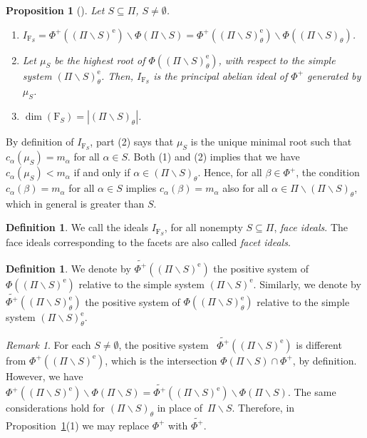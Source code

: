 \documentclass[10pt]{amsart}
\newtheorem{pro}[thm]{Proposition}
\theoremstyle{definition}
\newtheorem{defi}[thm]{Definition}
\theoremstyle{remark}
\newtheorem{rem}[thm]{Remark}
\newcommand\wt{\widetilde}
\newcommand\smeno{\smallsetminus}
\newcommand\al{\alpha}
\newcommand\be{\beta}
\newcommand\erm{{\mathrm{e}}}
\begin{document}
\begin{pro} [\cite{CM1}] \label{pro:IMRN}
Let $S\subseteq \Pi$, $S\neq\emptyset$.
\begin{enumerate}
\item\label{IMRN-1}
$I_{\mathrm F_S}=\Phi^+((\Pi\smeno S)^\erm)\smeno \Phi(\Pi\smeno S)=\Phi^+((\Pi\smeno S)^\erm_\theta)\smeno \Phi((\Pi\smeno S)_\theta)$. 
\label{itm:ideale}
\item
Let $\mu_S$ be the highest root of $\Phi((\Pi\smeno S)^\erm_\theta)$, with respect to the simple system  $(\Pi\smeno S)^\erm_\theta$. Then,
$I_{\mathrm F_S}$  is the principal abelian ideal of $\Phi^+$ generated by $\mu_S$.
\label{itm:principale}
\item
$\dim(\mathrm F_S)=|(\Pi\smeno S)_\theta|$.
\label{itm:dimensione}
\end{enumerate}
\end{pro}

By definition of $I_{\mathrm F_S}$, part (2)  says that $\mu_S$ is the unique minimal root  such that $c_\al(\mu_S)=m_\al$ for all $\al\in S$.
Both (1) and (2) implies that  we have $c_\al(\mu_S)<m_\al$ if and only if $\al\in (\Pi\smeno S)_\theta$. 
Hence, for all $\be\in \Phi^+$, the condition $c_\al(\be)=m_\al$ for all $\al\in S$ implies $c_\al(\be)=m_\al$ also for all  $\al\in \Pi\smeno (\Pi \smeno S)_\theta$, which in general is greater than $S$. 

\begin{defi}
We call the ideals $I_{\mathrm F_S}$, for all nonempty $S\subseteq \Pi$, {\it face ideals}.
The face ideals corresponding to the facets are also called {\it facet ideals}.
\end{defi}

\begin{defi}\label{def:phi-piu-tilde}
We denote by $\wt{\Phi^+}((\Pi \smeno S)^\erm)$ the positive system of $\Phi((\Pi \smeno S)^\erm)$ relative to  the simple system $(\Pi \smeno S)^\erm$.
Similarly, we denote by $\wt{\Phi^+}((\Pi \smeno S)^\erm_\theta)$ the positive system of $\Phi((\Pi \smeno S)^\erm_\theta)$ relative to  the simple system $(\Pi \smeno S)^\erm_\theta$.
\end{defi}

\begin{rem}\label{rem:proIMRN}
For each $S\neq \emptyset$, the positive system \ $\wt{\Phi^+}((\Pi \smeno S)^\erm)$ is different from $\Phi^+((\Pi \smeno S)^\erm)$, which  is the intersection $\Phi(\Pi \smeno S)\cap \Phi^+$, by definition.  
However, we have $\Phi^+((\Pi \smeno S)^\erm)\smeno \Phi(\Pi \smeno S)=\wt{\Phi^+}((\Pi \smeno S)^\erm)\smeno \Phi(\Pi \smeno S)$. 
The same considerations hold for $(\Pi \smeno S)_\theta$ in place of~$\Pi \smeno S$. 
Therefore, in Proposition~\ref{pro:IMRN}(1) we may replace  $\Phi^+$ with  $\wt {\Phi^+}$.
\end{rem}
\end{document}
